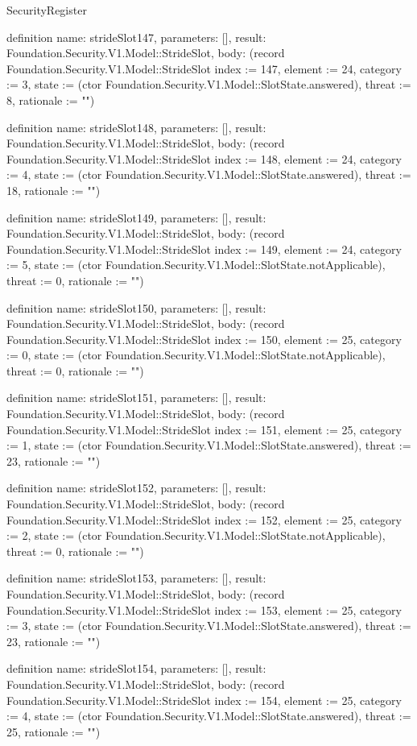 \begin{lexlean}{SecurityRegister}
\begin{semanticmodule}
definition{
  name: strideSlot147,
  parameters: [],
  result: Foundation.Security.V1.Model::StrideSlot,
  body: (record Foundation.Security.V1.Model::StrideSlot {index := 147, element := 24, category := 3, state := (ctor Foundation.Security.V1.Model::SlotState.answered), threat := 8, rationale := ""})
}

definition{
  name: strideSlot148,
  parameters: [],
  result: Foundation.Security.V1.Model::StrideSlot,
  body: (record Foundation.Security.V1.Model::StrideSlot {index := 148, element := 24, category := 4, state := (ctor Foundation.Security.V1.Model::SlotState.answered), threat := 18, rationale := ""})
}

definition{
  name: strideSlot149,
  parameters: [],
  result: Foundation.Security.V1.Model::StrideSlot,
  body: (record Foundation.Security.V1.Model::StrideSlot {index := 149, element := 24, category := 5, state := (ctor Foundation.Security.V1.Model::SlotState.notApplicable), threat := 0, rationale := ""})
}

definition{
  name: strideSlot150,
  parameters: [],
  result: Foundation.Security.V1.Model::StrideSlot,
  body: (record Foundation.Security.V1.Model::StrideSlot {index := 150, element := 25, category := 0, state := (ctor Foundation.Security.V1.Model::SlotState.notApplicable), threat := 0, rationale := ""})
}

definition{
  name: strideSlot151,
  parameters: [],
  result: Foundation.Security.V1.Model::StrideSlot,
  body: (record Foundation.Security.V1.Model::StrideSlot {index := 151, element := 25, category := 1, state := (ctor Foundation.Security.V1.Model::SlotState.answered), threat := 23, rationale := ""})
}

definition{
  name: strideSlot152,
  parameters: [],
  result: Foundation.Security.V1.Model::StrideSlot,
  body: (record Foundation.Security.V1.Model::StrideSlot {index := 152, element := 25, category := 2, state := (ctor Foundation.Security.V1.Model::SlotState.notApplicable), threat := 0, rationale := ""})
}

definition{
  name: strideSlot153,
  parameters: [],
  result: Foundation.Security.V1.Model::StrideSlot,
  body: (record Foundation.Security.V1.Model::StrideSlot {index := 153, element := 25, category := 3, state := (ctor Foundation.Security.V1.Model::SlotState.answered), threat := 23, rationale := ""})
}

definition{
  name: strideSlot154,
  parameters: [],
  result: Foundation.Security.V1.Model::StrideSlot,
  body: (record Foundation.Security.V1.Model::StrideSlot {index := 154, element := 25, category := 4, state := (ctor Foundation.Security.V1.Model::SlotState.answered), threat := 25, rationale := ""})
}


\end{semanticmodule}
\end{lexlean}
